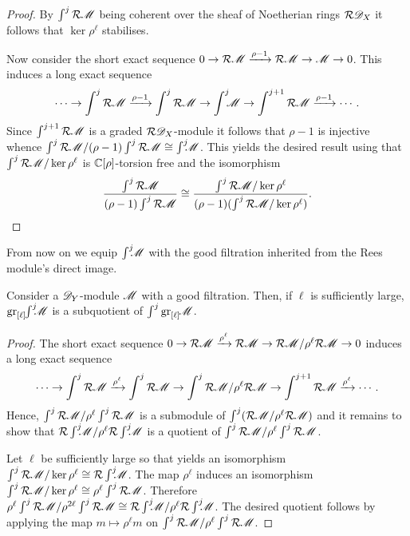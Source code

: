 \begin{proof}
  By $\int^j \mathcal{R} \mathscr{M}$ being coherent over the sheaf of Noetherian rings $\mathcal{R}\mathscr{D}_X$ it follows that $\ker \rho^\ell$ stabilises.

    Now consider the short exact sequence $0\to \mathcal{R} \mathscr{M} \xrightarrow{\rho-1} \mathcal{R} \mathscr{M} \to \mathscr{M} \to 0$. This induces a long exact sequence
    $$\cdots \to \int^j \mathcal{R} \mathscr{M} \xrightarrow{\rho-1} \int^j \mathcal{R} \mathscr{M} \to \int^j \mkern -8mu \mathscr{M} \to \int^{j+1} \mathcal{R} \mathscr{M} \xrightarrow{\rho-1}\cdots. $$
    Since $\int^{j+1} \mathcal{R} \mathscr{M}$ is a graded $\mathcal{R}\mathscr{D}_X$-module it follows that $\rho-1$ is injective whence $\int^j \mathcal{R} \mathscr{M} / (\rho-1)\int^j \mathcal{R} \mathscr{M} \cong \int^j \mkern -8mu \mathscr{M}$. This yields the desired result using that $\int^j \mathcal{R} \mathscr{M} / \ker \rho^\ell$ is $\mathbb{C}[\rho]$-torsion free and the isomorphism
    $$ \frac{\int^j \mathcal{R} \mathscr{M} }{(\rho-1)\int^j \mathcal{R} \mathscr{M} } \cong \frac{\int^j \mathcal{R} \mathscr{M} /\ker \rho^\ell }{(\rho-1)(\int^j \mathcal{R} \mathscr{M}/\ker \rho^\ell) }.$$
\end{proof}
From now on we equip $\int^j \mkern -8mu \mathscr{M}$ with the good filtration inherited from the Rees module's direct image.
\begin{lemma}\label{lem: EllLargeSubquotent}
    Consider a $\mathscr{D}_Y$-module $\mathscr{M}$ with a good filtration.
    Then, if $\ell$ is sufficiently large, $\operatorname{gr}_{[\ell]}\mkern-5mu \int^j \mkern -8mu\mathscr{M}$ is a subquotient of $\int^j\operatorname{gr}_{[\ell]}\mkern-5mu\mathscr{M}$.
\end{lemma}
\begin{proof}
  The short exact sequence $0\to \mathcal{R}\mathscr{M} \xrightarrow{\rho^\ell}\mathcal{R} \mathscr{M} \to \mathcal{R}\mathscr{M} / \rho^\ell \mathcal{R}\mathscr{M} \to 0$ induces a long exact sequence
  $$\cdots \to \int^j \mathcal{R} \mathscr{M} \xrightarrow{\rho^\ell} \int^j \mathcal{R} \mathscr{M} \to \int^j \mathcal{R}\mathscr{M}/\rho^\ell \mathcal{R}\mathscr{M} \to \int^{j+1} \mathcal{R} \mathscr{M} \xrightarrow{\rho^\ell}\cdots. $$
  Hence, $\int^j \mathcal{R} \mathscr{M} / \rho^\ell \int^j \mathcal{R} \mathscr{M}$ is a submodule of $\int^j (\mathcal{R}\mathscr{M}/\rho^\ell \mathcal{R}\mathscr{M})$ and it remains to show that $\mathcal{R} \int^j \mkern -8mu \mathscr{M}/ \rho^\ell \mathcal{R} \int^j \mkern -8mu \mathscr{M}$ is a quotient of $\int^j \mathcal{R} \mathscr{M} / \rho^\ell \int^j \mathcal{R} \mathscr{M}$.

  Let $\ell$ be sufficiently large so that  yields an isomorphism $\int^j \mathcal{R} \mathscr{M} / \ker \rho^\ell \cong \mathcal{R}\int^j \mkern -8mu\mathscr{M}$.
  The map $\rho^\ell$ induces an isomorphism $\int^j \mathcal{R} \mathscr{M} / \ker \rho^\ell \cong \rho^\ell \int^j \mathcal{R} \mathscr{M}$.
  Therefore $\rho^\ell \int^j \mathcal{R} \mathscr{M} / \rho^{2\ell}\int^j \mathcal{R}\mathscr{M} \cong \mathcal{R} \int^j \mkern -8mu \mathscr{M} / \rho^\ell \mathcal{R}\int^j \mkern -8mu \mathscr{M} $.
  The desired quotient follows by applying the map $m\mapsto \rho^\ell m$ on $\int^j \mathcal{R} \mathscr{M} / \rho^\ell \int^j \mathcal{R} \mathscr{M}$.
\end{proof}
